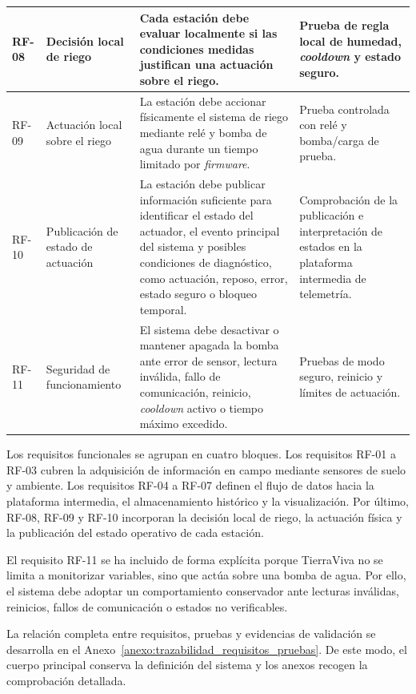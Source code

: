 \begin{longtable}{|
>{\raggedright\arraybackslash}p{}|
>{\raggedright\arraybackslash}p{}|
>{\raggedright\arraybackslash}p{}|
>{\raggedright\arraybackslash}p{}|}
\hline
RF-08 & Decisión local de riego & Cada estación debe evaluar localmente si las condiciones medidas justifican una actuación sobre el riego. & Prueba de regla local de humedad, \textit{cooldown} y estado seguro. \\
\hline
RF-09 & Actuación local sobre el riego & La estación debe accionar físicamente el sistema de riego mediante relé y bomba de agua durante un tiempo limitado por \textit{firmware}. & Prueba controlada con relé y bomba/carga de prueba. \\
\hline
RF-10 & Publicación de estado de actuación & La estación debe publicar información suficiente para identificar el estado del actuador, el evento principal del sistema y posibles condiciones de diagnóstico, como actuación, reposo, error, estado seguro o bloqueo temporal. & Comprobación de la publicación e interpretación de estados en la plataforma intermedia de telemetría. \\
\hline
RF-11 & Seguridad de funcionamiento & El sistema debe desactivar o mantener apagada la bomba ante error de sensor, lectura inválida, fallo de comunicación, reinicio, \textit{cooldown} activo o tiempo máximo excedido. & Pruebas de modo seguro, reinicio y límites de actuación. \\
\hline

\end{longtable}

\normalsize

Los requisitos funcionales se agrupan en cuatro bloques. Los requisitos RF-01 a RF-03 cubren la adquisición de información en campo mediante sensores de suelo y ambiente. Los requisitos RF-04 a RF-07 definen el flujo de datos hacia la plataforma intermedia, el almacenamiento histórico y la visualización. Por último, RF-08, RF-09 y RF-10 incorporan la decisión local de riego, la actuación física y la publicación del estado operativo de cada estación.

El requisito RF-11 se ha incluido de forma explícita porque TierraViva no se limita a monitorizar variables, sino que actúa sobre una bomba de agua. Por ello, el sistema debe adoptar un comportamiento conservador ante lecturas inválidas, reinicios, fallos de comunicación o estados no verificables.

La relación completa entre requisitos, pruebas y evidencias de validación se desarrolla en el Anexo~\ref{anexo:trazabilidad_requisitos_pruebas}. De este modo, el cuerpo principal conserva la definición del sistema y los anexos recogen la comprobación detallada.

